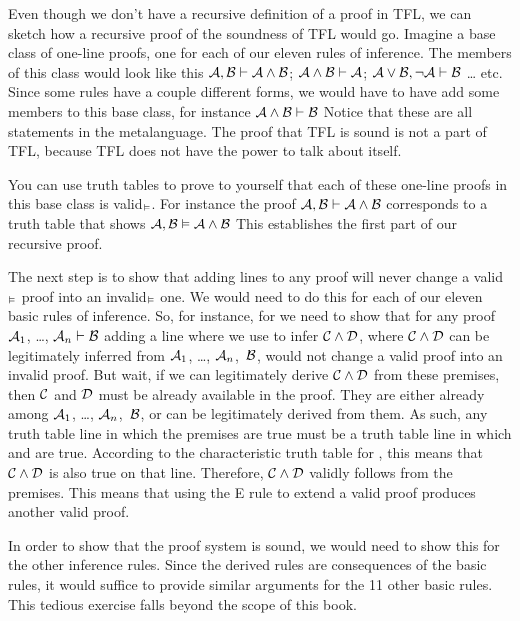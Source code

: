 Even though we don't have a recursive definition of a proof in TFL, we can sketch how a recursive proof of the soundness of TFL would go. Imagine a base class of one-line proofs, one for each of our eleven rules of inference. The members of this class would look like this $\mathcal{A}, \mathcal{B} \vdash  \mathcal{A} \wedge \mathcal{B}$; $\mathcal{A} \wedge \mathcal{B} \vdash \mathcal{A}$; $\mathcal{A} \vee \mathcal{B}, \neg\mathcal{A} \vdash  \mathcal{B}$ \ldots{} etc. Since some rules have a couple different forms, we would have to have add some members to this base class, for instance $\mathcal{A} \wedge \mathcal{B} \vdash  \mathcal{B}$ Notice that these are all statements in the metalanguage. The proof that TFL is sound is not a part of TFL, because TFL does not have the power to talk about itself. 

You can use truth tables to prove to yourself that each of these one-line proofs in this base class is valid$_{\vDash}$. For instance the proof $\mathcal{A}, \mathcal{B} \vdash \mathcal{A} \wedge \mathcal{B}$ corresponds to a truth table that shows $\mathcal{A}, \mathcal{B} \vDash  \mathcal{A} \wedge \mathcal{B}$ This establishes the first part of our recursive proof. 

The next step is to show that adding lines to any proof will never change a valid$_{\vDash}$ proof into an invalid$_{\vDash}$ one. We would need to do this for each of our eleven basic rules of inference. So, for instance, for  we need to show that for any proof $\mathcal{A}_{1}$, \dots, $\mathcal{A}_{n} \vdash  \mathcal{B}$ adding a line where we use  to infer $\mathcal{C} \wedge \mathcal{D}$, where $\mathcal{C} \wedge \mathcal{D}$ can be legitimately inferred from $\mathcal{A}_{1}$, \dots, $\mathcal{A}_{n}$,~$\mathcal{B}$, would not change a valid proof into an invalid proof. But wait, if we can legitimately derive $\mathcal{C} \wedge \mathcal{D}$ from these premises, then $\mathcal{C}$ and $\mathcal{D}$ must be already available in the proof. They are either already among $\mathcal{A}_{1}$, \dots, $\mathcal{A}_{n}$,~$\mathcal{B}$, or can be legitimately derived from them. As such, any truth table line in which the premises are true must be a truth table line in which  and  are true. According to the characteristic truth table for \eand, this means that $\mathcal{C} \wedge \mathcal{D}$ is also true on that line. Therefore, $\mathcal{C} \wedge \mathcal{D}$ validly follows from the premises. This means that using the {\eand}E rule to extend a valid proof produces another valid proof.

In order to show that the proof system is sound, we would need to show this for the other inference rules. Since the derived rules are consequences of the basic rules, it would suffice to provide similar arguments for the 11 other basic rules. This tedious exercise falls beyond the scope of this book.

